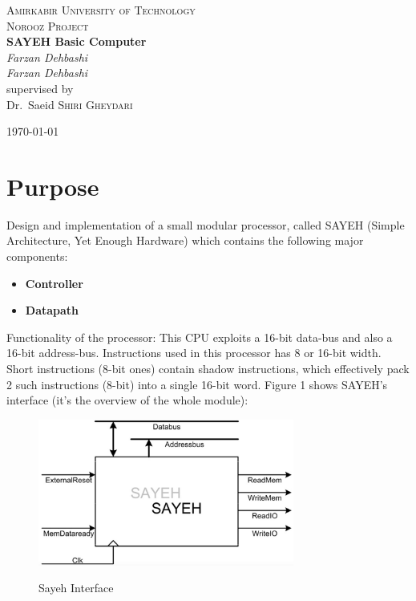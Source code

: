 \documentclass{report}
\begin{document}
\begin{titlepage}
	\centering
	
	{\scshape\LARGE Amirkabir University of Technology}\\
	\vspace{1cm}
	{\scshape\Large Norooz Project}\\
	\vspace{1.5cm}
	{\huge\bfseries SAYEH Basic Computer}\\
	\vspace{2cm}
	{\Large\itshape Farzan Dehbashi}\\
	{\Large\itshape Farzan Dehbashi}\\
	\vfill
	supervised by\\
	Dr.~Saeid \textsc{Shiri Gheydari}\\

	\vfill

	{\large \today}\\
\end{titlepage}
\newpage

\tableofcontents
\newpage

\section{Purpose}
\par
Design and implementation of a small modular processor, called SAYEH (Simple Architecture, Yet Enough Hardware)
which contains the following major components:

\begin{itemize}
	\item \textbf{Controller}
        \item \textbf{Datapath}
\end{itemize}

\par
Functionality of the processor:
This CPU exploits a 16-bit data-bus and also a 16-bit address-bus.
Instructions used in this processor has 8 or 16-bit width.
Short instructions (8-bit ones) contain shadow instructions,
which effectively pack 2 such instructions (8-bit) into a single
16-bit word. Figure 1 shows SAYEH’s interface
(it's the overview of the whole module):

\begin{figure}[ht]
	\centering
        \includegraphics[width=0.75\textwidth]{figs/fig1}\\
        \caption{Sayeh Interface}
\end{figure}
\end{document}
